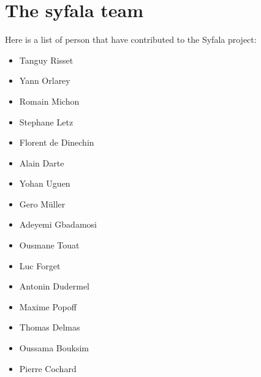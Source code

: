 \section{The syfala team}
\label{team}
Here is a list of person that have contributed to the Syfala project:
\begin{itemize}
\item Tanguy Risset
\item Yann Orlarey
\item Romain Michon
\item Stephane Letz
\item Florent de Dinechin
\item Alain Darte
\item Yohan Uguen
\item Gero Müller
\item Adeyemi Gbadamosi
\item Ousmane Touat
\item Luc Forget
\item Antonin Dudermel
\item Maxime Popoff
\item Thomas Delmas
\item Oussama Bouksim
\item Pierre Cochard
\end{itemize}


